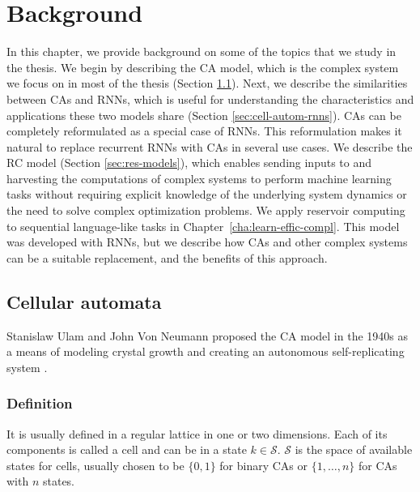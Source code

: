 \chapter{Background}
\label{cha:background}

In this chapter, we provide background on some of the topics that we study in
the thesis. We begin by describing the \acf{CA} model, which is the complex
system we focus on in most of the thesis (Section
\ref{sec:cellular-automata-sec}). Next, we describe the similarities between
\acp{CA} and \acfp{RNN}, which is useful for understanding the characteristics
and applications these two models share (Section \ref{sec:cell-autom-rnns}).
\acp{CA} can be completely reformulated as a special case of \acp{RNN}. This
reformulation makes it natural to replace recurrent \acp{RNN} with \acp{CA} in
several use cases. We describe the \acf{RC} model (Section
\ref{sec:res-models}), which enables sending inputs to and harvesting the
computations of complex systems to perform machine learning tasks without
requiring explicit knowledge of the underlying system dynamics or the need to
solve complex optimization problems. We apply reservoir computing to sequential
language-like tasks in Chapter~\ref{cha:learn-effic-compl}. This model was
developed with \acp{RNN}, but we describe how \acp{CA} and other complex systems
can be a suitable replacement, and the benefits of this approach.

\section{Cellular automata}\label{sec:cellular-automata-sec}

Stanislaw Ulam and John Von
Neumann proposed the \ac{CA} model in the 1940s as a means 
of modeling crystal growth and creating an autonomous self-replicating system
\parencite{vonneumannTheorySelfreproducingAutomata1966}.

\subsection{Definition}\label{sec:definition}
It is usually defined in a regular lattice in one or two dimensions. Each of its
components is called a cell and can be in a state $k \in \mathcal{S}$. $\mathcal{S}$ is the space of
available states for cells, usually chosen to be $\{0, 1\}$ for binary
\acp{CA} or $\{1, \ldots, n\}$ for \acp{CA} with $n$ states.


